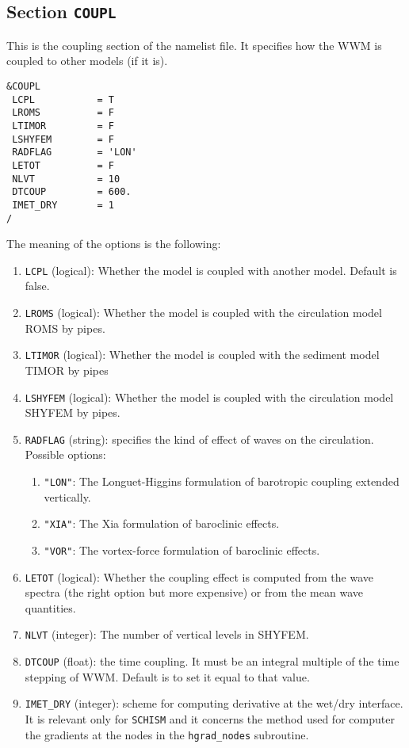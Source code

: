 \documentclass[12pt]{amsart}
\begin{document}
\newpage

\subsection{Section {\tt COUPL}}
This is the coupling section of the namelist file. It specifies how the WWM is coupled to other models (if it is).
\begin{verbatim}
&COUPL
 LCPL           = T                
 LROMS          = F                
 LTIMOR         = F                
 LSHYFEM        = F                
 RADFLAG        = 'LON'
 LETOT          = F                
 NLVT           = 10     
 DTCOUP         = 600.   
 IMET_DRY       = 1
/
\end{verbatim}
The meaning of the options is the following:
\begin{enumerate}
\item {\tt LCPL} (logical): Whether the model is coupled with another model. Default is false.
\item {\tt LROMS} (logical): Whether the model is coupled with the circulation model ROMS by pipes.
\item {\tt LTIMOR} (logical): Whether the model is coupled with the sediment model TIMOR by pipes
\item {\tt LSHYFEM} (logical): Whether the model is coupled with the circulation model SHYFEM by pipes.
\item {\tt RADFLAG} (string): specifies the kind of effect of waves on the circulation. Possible options:
  \begin{enumerate}
  \item {\tt "LON"}: The Longuet-Higgins formulation of barotropic coupling extended vertically.
  \item {\tt "XIA"}: The Xia formulation of baroclinic effects.
  \item {\tt "VOR"}: The vortex-force formulation of baroclinic effects.
  \end{enumerate}
\item {\tt LETOT} (logical): Whether the coupling effect is computed from the wave spectra (the right option but more expensive) or from the mean wave quantities.
\item {\tt NLVT} (integer): The number of vertical levels in SHYFEM.
\item {\tt DTCOUP} (float): the time coupling. It must be an integral multiple of the time stepping of WWM. Default is to set it equal to that value.
\item {\tt IMET\_DRY} (integer): scheme for computing derivative at the wet/dry interface. It is relevant only for {\tt SCHISM} and it concerns the method used for computer the gradients at the nodes in the {\tt hgrad\_nodes} subroutine.
\end{enumerate}
\end{document}
